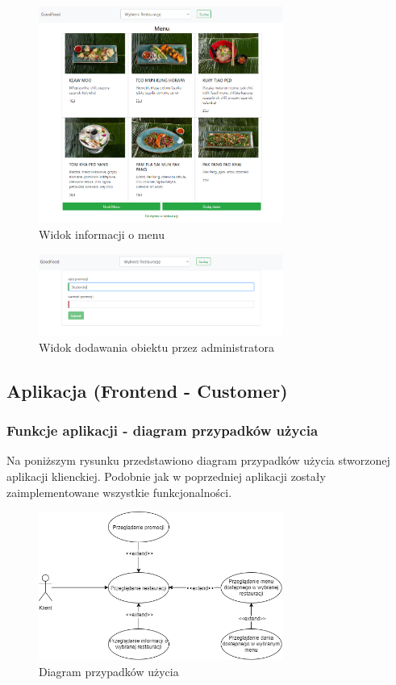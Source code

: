 \documentclass{article}
\begin{document}
			\begin{figure}[hbt!]
				\includegraphics[width=8cm]{Files/Pictures/MenuList_A}
				\centering
				\caption{Widok informacji o menu}
			\end{figure}

			\begin{figure}[hbt!]
				\includegraphics[width=8cm]{Files/Pictures/Add_A}
				\centering
				\caption{Widok dodawania obiektu przez administratora}
			\end{figure}
	
	\newpage
	\subsection{Aplikacja (Frontend - Customer)}

		\subsubsection{Funkcje aplikacji - diagram przypadków użycia}
		Na poniższym rysunku przedstawiono diagram przypadków użycia stworzonej aplikacji klienckiej. Podobnie jak w poprzedniej aplikacji zostały zaimplementowane wszystkie funkcjonalności.
			\begin{figure}[hbt!]
				\includegraphics[width=8cm]{Files/Pictures/UMLCustomerApp}
				\centering
				\caption{Diagram przypadków użycia}
			\end{figure}
\end{document}
